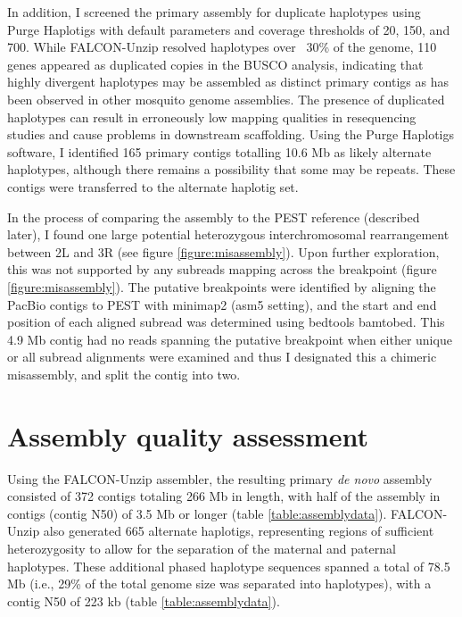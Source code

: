 \par{
In addition, I screened the primary assembly for duplicate haplotypes using Purge Haplotigs\cite{purge} with default parameters and coverage thresholds of 20, 150, and 700. While FALCON-Unzip resolved haplotypes over ~30\% of the genome, 110 genes appeared as duplicated copies in the BUSCO analysis, indicating that highly divergent haplotypes may be assembled as distinct primary contigs as has been observed in other mosquito genome assemblies\cite{aegypti}\cite{funestus}. The presence of duplicated haplotypes can result in erroneously low mapping qualities in resequencing studies and cause problems in downstream scaffolding. Using the Purge Haplotigs software\cite{purge}, I identified 165 primary contigs totalling 10.6 Mb as likely alternate haplotypes, although there remains a possibility that some may be repeats. These contigs were transferred to the alternate haplotig set.
} 


\par{
In the process of comparing the assembly to the PEST reference (described later), I found one large potential heterozygous interchromosomal rearrangement between 2L and 3R (see figure \ref{figure:misassembly}). Upon further exploration, this was not supported by any subreads mapping across the breakpoint (figure \ref{figure:misassembly}). The putative breakpoints were identified by aligning the PacBio contigs to PEST with minimap2 (asm5 setting)\cite{minimap2}, and the start and end position of each aligned subread was determined using bedtools bamtobed\cite{bedtools}. This 4.9 Mb contig had no reads spanning the putative breakpoint when either unique or all subread alignments were examined and thus I designated this a chimeric misassembly, and split the contig into two.
}



\section{Assembly quality assessment}


\par{
Using the FALCON-Unzip assembler\cite{falcon}, the resulting primary \textit{de novo} assembly consisted of 372 contigs totaling 266 Mb in length, with half of the assembly in contigs (contig N50) of 3.5 Mb or longer (table \ref{table:assemblydata}). FALCON-Unzip also generated 665 alternate haplotigs, representing regions of sufficient heterozygosity to allow for the separation of the maternal and paternal haplotypes. These additional phased haplotype sequences spanned a total of 78.5 Mb (i.e., 29\% of the total genome size was separated into haplotypes), with a contig N50 of 223 kb (table \ref{table:assemblydata}). 
}


